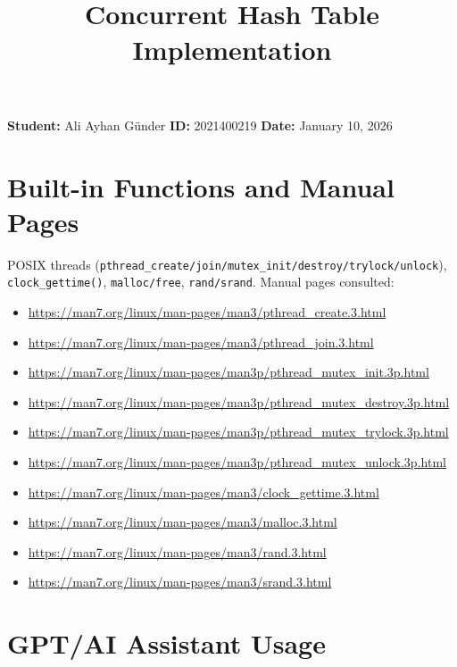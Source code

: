 \documentclass[a4paper,12pt]{article}
\title{\vspace{-1.5cm}{\LARGE\bfseries\color{primarycolor}CMPE 322 Project 2 Report}\\[0.1cm]{\large Concurrent Hash Table Implementation}\vspace{-0.5cm}}
\author{}
\date{}
\begin{document}
\maketitle
\thispagestyle{fancy}

\begin{tcolorbox}[colback=lightgray,colframe=primarycolor,boxrule=0.4pt,arc=2pt,left=3mm,right=3mm,top=1mm,bottom=1mm]
\centering\small
\textbf{Student:} Ali Ayhan Günder \quad \textbf{ID:} 2021400219 \quad \textbf{Date:} January 10, 2026
\end{tcolorbox}

\vspace{-2pt}

\section{Built-in Functions and Manual Pages}

POSIX threads (\texttt{pthread\_create/join/mutex\_init/destroy/trylock/unlock}), \texttt{clock\_gettime()}, \texttt{malloc/free}, \texttt{rand/srand}. Manual pages consulted:
\begin{itemize}
    \item \url{https://man7.org/linux/man-pages/man3/pthread_create.3.html}
    \item \url{https://man7.org/linux/man-pages/man3/pthread_join.3.html}
    \item \url{https://man7.org/linux/man-pages/man3p/pthread_mutex_init.3p.html}
    \item \url{https://man7.org/linux/man-pages/man3p/pthread_mutex_destroy.3p.html}
    \item \url{https://man7.org/linux/man-pages/man3p/pthread_mutex_trylock.3p.html}
    \item \url{https://man7.org/linux/man-pages/man3p/pthread_mutex_unlock.3p.html}
    \item \url{https://man7.org/linux/man-pages/man3/clock_gettime.3.html}
    \item \url{https://man7.org/linux/man-pages/man3/malloc.3.html}
    \item \url{https://man7.org/linux/man-pages/man3/rand.3.html}
    \item \url{https://man7.org/linux/man-pages/man3/srand.3.html}
\end{itemize}

\section{GPT/AI Assistant Usage}
\end{document}
